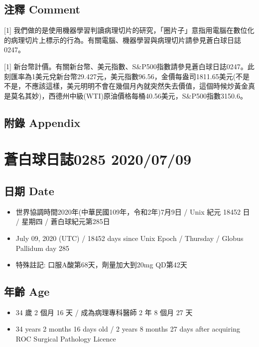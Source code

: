 \documentclass[a5paper, 11pt
]{book}
\providecommand{\tightlist}{%
  \setlength{\itemsep}{0pt}\setlength{\parskip}{0pt}}
\begin{document}
\hypertarget{ux6ce8ux91cb-comment-37}{%
\subsection{注釋 Comment}\label{ux6ce8ux91cb-comment-37}}

{[}1{]}
我們做的是使用機器學習判讀病理切片的研究，「圈片子」意指用電腦在數位化的病理切片上標示的行為。有關電腦、機器學習與病理切片請參見蒼白球日誌0247。

{[}1{]}
新台幣計價。有關新台幣、美元指數、S\&P500指數請參見蒼白球日誌0247。此刻匯率為1美元兌新台幣29.427元，美元指數96.56，金價每盎司1811.65美元(不是不是，不應該這樣，美元明明不會在幾個月內就突然失去價值，這個時候炒黃金真是莫名其妙)，西德州中級(WTI)原油價格每桶40.56美元，S\&P500指數3150.6。

\hypertarget{ux9644ux9304-appendix-37}{%
\subsection{附錄 Appendix}\label{ux9644ux9304-appendix-37}}

\hypertarget{ux84bcux767dux7403ux65e5ux8a8c0285-20200709}{%
\section{蒼白球日誌0285
2020/07/09}\label{ux84bcux767dux7403ux65e5ux8a8c0285-20200709}}

\hypertarget{ux65e5ux671f-date-38}{%
\subsection{日期 Date}\label{ux65e5ux671f-date-38}}

\begin{itemize}
\tightlist
\item
  世界協調時間2020年(中華民國109年，令和2年)7月9日 / Unix 紀元 18452 日
  / 星期四 / 蒼白球紀元第285日
\item
  July 09, 2020 (UTC) / 18452 days since Unix Epoch / Thursday / Globus
  Pallidum day 285
\item
  特殊註記: 口服A酸第68天，劑量加大到20mg QD第42天
\end{itemize}

\hypertarget{ux5e74ux9f61-age-38}{%
\subsection{年齡 Age}\label{ux5e74ux9f61-age-38}}

\begin{itemize}
\tightlist
\item
  34 歲 2 個月 16 天 / 成為病理專科醫師 2 年 8 個月 27 天
\item
  34 years 2 months 16 days old / 2 years 8 months 27 days after
  acquiring ROC Surgical Pathology Licence
\end{itemize}
\end{document}
